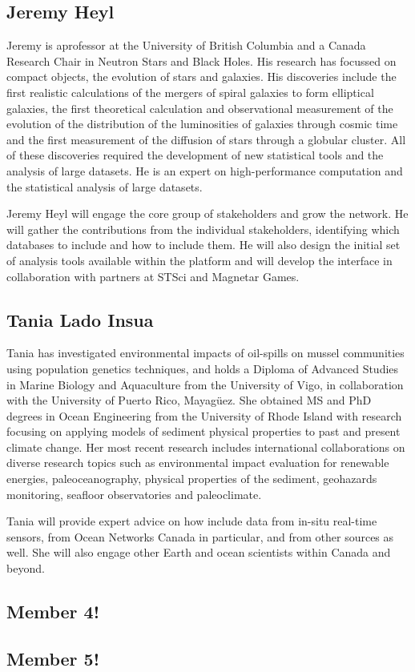 \subsection*{Jeremy Heyl}
Jeremy is aprofessor at the University of British Columbia and a
Canada Research Chair in Neutron Stars and Black Holes.  His research
has focussed on compact objects, the evolution of stars and galaxies.
His discoveries include the first realistic calculations of the
mergers of spiral galaxies to form elliptical galaxies, the first
theoretical calculation and observational measurement of the evolution
of the distribution of the luminosities of galaxies through cosmic
time and the first measurement of the diffusion of stars through a
globular cluster.  All of these discoveries required the development
of new statistical tools and the analysis of large datasets. He is an
expert on high-performance computation and the statistical analysis of
large datasets.

Jeremy Heyl will engage the core group of stakeholders and grow the
network.  He will gather the contributions from the individual
stakeholders, identifying which databases to include and how to
include them.  He will also design the initial set of analysis tools
available within the platform and will develop the interface in
collaboration with partners at STSci and Magnetar Games.

\subsection*{Tania Lado Insua}

Tania has investigated environmental impacts of oil-spills on mussel
communities using population genetics techniques, and holds a Diploma
of Advanced Studies in Marine Biology and Aquaculture from the
University of Vigo, in collaboration with the University of Puerto
Rico, Mayagüez.  She obtained MS and PhD degrees in Ocean Engineering
from the University of Rhode Island with research focusing on applying
models of sediment physical properties to past and present climate
change. Her most recent research includes international collaborations
on diverse research topics such as environmental impact evaluation for
renewable energies, paleoceanography, physical properties of the
sediment, geohazards monitoring, seafloor observatories and
paleoclimate.

Tania will provide expert advice on how include data from in-situ
real-time sensors, from Ocean Networks Canada in particular, and from
other sources as well.  She will also engage other Earth and ocean
scientists within Canada and beyond.

\subsection*{Member 4!}


\subsection*{Member 5!}

